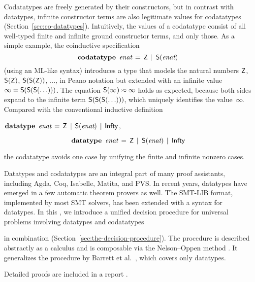 Codatatypes are freely generated by their constructors, but in contrast with datatypes,
infinit\-e constructor terms are also legitimate values for codatatypes
(Section~\ref{sec:co-datatypes}). Intuitively, the
values of a codatatype consist of all well-typed finite and infinite ground
constructor
terms, and only those. As a simple example, the coinductive specification
%
\[\textbf{codatatype}~\,\textit{enat} \,=\, \textsf{Z} \,\mid\, \textsf{S}(\textit{enat})\]
%
(using an ML-like syntax) introduces a type that
models the natural numbers $\textsf{Z}$, $\textsf{S}(\textsf{Z})$, $\textsf{S}(\textsf{S}(\textsf{Z}))$, $\ldots$\afterLdots{},
in Peano notation but extended with an
infinite value $\infty = \textsf{S}(\textsf{S}(\textsf{S}(\ldots)))$.
The equation $\textsf{S}(\infty) \approx \infty$ holds as expected,
because both sides expand to the infinite term
$\textsf{S}(\textsf{S}(\textsf{S}(\ldots)))$, which uniquely identifies the
value~$\infty$.
Compared with the conventional inductive definition
\begin{conf}$\vthinspace \keyw{datatype}~\,\ty{enat} \,=\, \const{Z} \,\mid\, \const{S}(\ty{enat}) \,\mid\, \const{Infty}$\vvthinspace, \end{conf}%
\begin{rep}\[\vthinspace \keyw{datatype}~\,\ty{enat} \,=\, \const{Z} \,\mid\, \const{S}(\ty{enat}) \,\mid\, \const{Infty}\]\end{rep}%
the codatatype avoids
one case by unifying the finite and infinite nonzero cases.

{
Datatypes and codatatypes are an integral part of many proof assistants,
including Agda, Coq, Isabelle, Matita, and PVS. In recent years, datatypes
have emerged in a few automatic theorem provers as well. The SMT-LIB
format, implemented by most SMT
solvers, has been extended with a syntax for datatypes.
In this \thewordpaper, we introduce a
unified \hfill decision \hfill procedure \hfill for \hfill universal \hfill problems \hfill involving \hfill datatypes \hfill and \hfill codatatypes%
\begin{conf}\goodbreak\noindent\end{conf}%
\begin{rep} \end{rep}%
in combination (Section~\ref{sec:the-decision-procedure}).
The procedure is described abstractly as a %
calculus and is composable via the Nelson--Oppen method \cite{nelson-oppen-1979}.
It generalizes the procedure by Barrett et al.\ \cite{barrett-et-al-2007}, which covers
only datatypes.
\begin{conf}
Detailed proofs %
are included in a %
report
\cite{our-report}.
\end{conf}%

}

